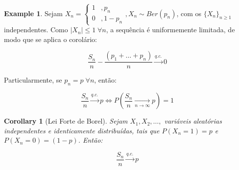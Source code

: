 \documentclass[
]{article}
\newtheorem{corollary}{Corollary}[section]
\theoremstyle{definition}
\theoremstyle{definition}
\newtheorem{example}{Example}[section]
\theoremstyle{definition}
\theoremstyle{definition}
\theoremstyle{remark}
\begin{document}
\begin{example}
Sejam \(X_{n} = \begin{cases} 1 &,p_{n} \\ 0 &,1-p_{n} \end{cases}, X_{n} \sim Ber(p_{n})\), com os \(\{X_{n}\}_{n \ge 1}\) independentes. Como \(|X_{n}| \le 1 \;\forall n\), a sequência é uniformemente limitada, de modo que se aplica o corolário:

\begin{equation*}
\frac{S_{n}}{n} - \frac{(p_{1} + \ldots + p_{n})}{n} \xrightarrow[]{q.c.} 0
\end{equation*}

Particularmente, se \(p_{n} = p \; \forall n\), então:

\begin{equation*}
\frac{S_{n}}{n} \xrightarrow[]{q.c.} p \Leftrightarrow P\left(\frac{S_{n}}{n} \xrightarrow[n \to \infty]{}p\right) = 1
\end{equation*}
\end{example}

\begin{corollary}[Lei Forte de Borel]
Sejam \(X_{1},X_{2},\ldots,\) variáveis aleatórias independentes e identicamente distribuídas, tais que \(P(X_{n} = 1) = p\) e \(P(X_{n} = 0) = (1 - p)\). Então:

\begin{equation*}
\frac{S_{n}}{n} \xrightarrow[]{q.c.}p
\end{equation*}
\end{corollary}
\end{document}
